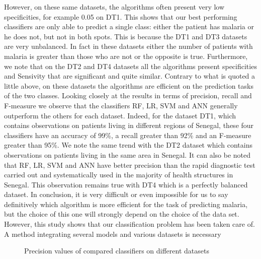 However, on these same datasets, the algorithms often present very low specificities, for example 0.05 on DT1. This shows that our best performing classifiers are only able to predict a single class: either the patient has malaria or he does not, but not in both spots. This is because the DT1 and DT3 datasets are very unbalanced. In fact in these datasets either the number of patients with malaria is greater than those who are not or the opposite is true. Furthermore, we note that on the DT2 and DT4 datasets all the algorithms present specificities and Sensivity that are significant and quite similar. Contrary to what is quoted a little above, on these datasets the algorithms are efficient on the prediction tasks of the two classes. Looking closely at the results in terms of precision, recall and F-measure we observe that the classifiers RF, LR, SVM and ANN generally outperform the others for each dataset. Indeed, for the dataset DT1, which contains observations on patients living in different regions of Senegal, these four classifiers have an accuracy of 99\%, a recall greater than 92\% and an F-measure greater than 95\%. We note the same trend with the DT2 dataset which contains observations on patients living in the same area in Senegal. It can also be noted that RF, LR, SVM and ANN have better precision than the rapid diagnostic test carried out and systematically used in the majority of health structures in Senegal. This observation remains true with DT4 which is a perfectly balanced dataset. In conclusion, it is very difficult or even impossible for us to say definitively which algorithm is more efficient for the task of predicting malaria, but the choice of this one will strongly depend on the choice of the data set. However, this study shows that our classification problem has been taken care of. A method integrating several models and various datasets is necessary

\begin{figure}
\caption{Precision values of compared classifiers on different datasets}

\end{figure}


